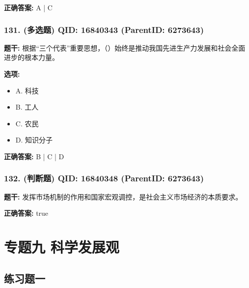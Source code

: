 \documentclass[12pt,UTF8]{ctexart}
\begin{document}
\textbf{正确答案:}
A | C

\vspace{0.3em}\hrulefill\vspace{0.7em}

\subsubsection*{131. (多选题) \small QID: 16840343 (ParentID: 6273643)}

\textbf{题干:}
根据“三个代表”重要思想，（）始终是推动我国先进生产力发展和社会全面进步的根本力量。



\textbf{选项:}
\begin{itemize}[leftmargin=*]

  \item A. 科技

  \item B. 工人

  \item C. 农民

  \item D. 知识分子

\end{itemize}

\textbf{正确答案:}
B | C | D

\vspace{0.3em}\hrulefill\vspace{0.7em}

\subsubsection*{132. (判断题) \small QID: 16840348 (ParentID: 6273643)}

\textbf{题干:}
发挥市场机制的作用和国家宏观调控，是社会主义市场经济的本质要求。



\textbf{正确答案:}
true

\vspace{0.3em}\hrulefill\vspace{0.7em}

\section*{专题九  科学发展观}
\hrulefill

\subsection*{练习题一}
\end{document}
